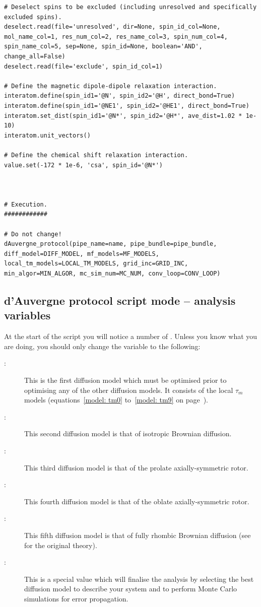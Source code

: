 \begin{htmlonly}
\begin{htmlonly}
\begin{lstlisting}
# Deselect spins to be excluded (including unresolved and specifically excluded spins).
deselect.read(file='unresolved', dir=None, spin_id_col=None, mol_name_col=1, res_num_col=2, res_name_col=3, spin_num_col=4, spin_name_col=5, sep=None, spin_id=None, boolean='AND', change_all=False)
deselect.read(file='exclude', spin_id_col=1)

# Define the magnetic dipole-dipole relaxation interaction.
interatom.define(spin_id1='@N', spin_id2='@H', direct_bond=True)
interatom.define(spin_id1='@NE1', spin_id2='@HE1', direct_bond=True)
interatom.set_dist(spin_id1='@N*', spin_id2='@H*', ave_dist=1.02 * 1e-10)
interatom.unit_vectors()

# Define the chemical shift relaxation interaction.
value.set(-172 * 1e-6, 'csa', spin_id='@N*')



# Execution.
############

# Do not change!
dAuvergne_protocol(pipe_name=name, pipe_bundle=pipe_bundle, diff_model=DIFF_MODEL, mf_models=MF_MODELS, local_tm_models=LOCAL_TM_MODELS, grid_inc=GRID_INC, min_algor=MIN_ALGOR, mc_sim_num=MC_NUM, conv_loop=CONV_LOOP)
\end{lstlisting}



\subsection{d'Auvergne protocol script mode -- analysis variables} \label{sect: d'Auvergne protocol script variables}

At the start of the script you will notice a number of .
Unless you know what you are doing, you should only change the  variable to the following:
\begin{description}
  \item[:]  This is the first diffusion model which must be optimised prior to optimising any of the other diffusion models.
    It consists of the local $\tau_m$ models (equations~\ref{model: tm0} to~\ref{model: tm9} on page~\pageref{model: tm0}).
  \item[:]  This second diffusion model is that of isotropic Brownian diffusion.
  \item[:]  This third diffusion model is that of the prolate axially-symmetric rotor.
  \item[:]  This fourth diffusion model is that of the oblate axially-symmetric rotor.
  \item[:]  This fifth diffusion model is that of fully rhombic Brownian diffusion (see \citet{Perrin34,Perrin36} for the original theory).
  \item[:]  This is a special value which will finalise the analysis by selecting the best diffusion model to describe your system and to perform Monte Carlo simulations for error propagation.
\end{description}


\end{htmlonly}
\end{htmlonly}
